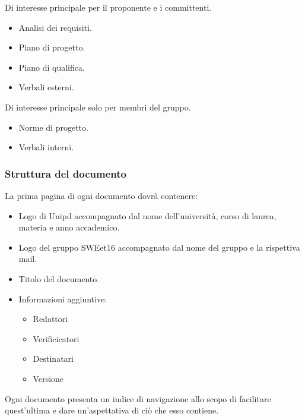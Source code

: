     Di interesse principale per il proponente e i committenti.
    \begin{itemize}
      \item Analisi dei requisiti.
      \item Piano di progetto.
      \item Piano di qualifica.
      \item Verbali esterni.
    \end{itemize}

    Di interesse principale solo per membri del gruppo.
    \begin{itemize}
      \item Norme di progetto.
      \item Verbali interni.
    \end{itemize}


\subsubsection{Struttura del documento}

        La prima pagina di ogni documento dovrà contenere:
        \begin{itemize}
          \item Logo di Unipd accompagnato dal nome dell'università, corso di laurea, materia e anno accademico.
          \item Logo del gruppo SWEet16 accompagnato dal nome del gruppo e la rispettiva mail.
          \item Titolo del documento.
          \item Informazioni aggiuntive:
          \begin{itemize}
            \item Redattori
            \item Verificicatori
            \item Destinatari
            \item Versione
          \end{itemize}
        \end{itemize}


        Ogni documento presenta un indice di navigazione allo scopo di facilitare quest'ultima e
        dare un'aspettativa di ciò che esso contiene.

